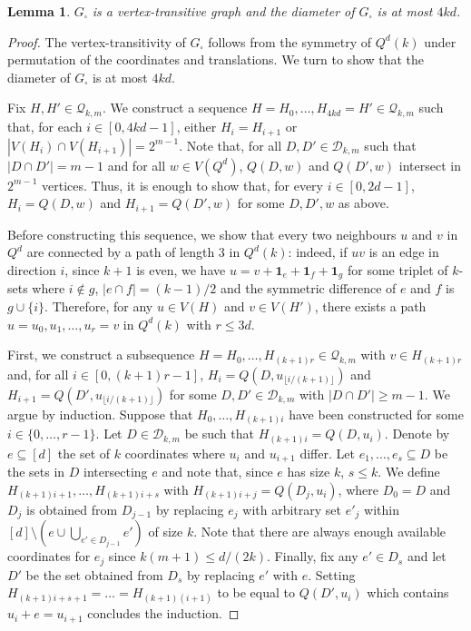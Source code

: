 \documentclass{article}
\newtheorem{lemma}[thm]{Lemma}
\theoremstyle{definition}
\newcommand{\cD}{\mathcal{D}}
\newcommand{\cQ}{\mathcal{Q}}
\begin{document}
\begin{lemma}\label{lem:diameter}
$G_{\square}$ is a vertex-transitive graph and the diameter of $G_{\square}$ is at most $4kd$. 
\end{lemma}
\begin{proof}
The vertex-transitivity of $G_\square$ follows from the symmetry of $Q^d(k)$ under permutation of the coordinates and translations. We turn to show that the diameter of $G_{\square}$ is at most $4kd$. 

Fix $H,H'\in\cQ_{k,m}$. We construct a sequence $H=H_0,\ldots,H_{4kd}=H'\in\cQ_{k,m}$ such that, for each $i\in [0,4kd-1]$, either $H_i=H_{i+1}$ or $|V(H_i)\cap V(H_{i+1})|=2^{m-1}$. 
Note that, for all $D,D'\in\cD_{k,m}$ such that $|D\cap D'|=m-1$ and for all $w\in V(Q^d)$, $Q(D,w)$ and $Q(D',w)$ intersect in $2^{m-1}$ vertices. 
Thus, it is enough to show that, for every $i\in [0,2d-1]$, $H_i=Q(D,w)$ and $H_{i+1}=Q(D',w)$ for some $D,D',w$ as above.

Before constructing this sequence, we show that every two neighbours $u$ and $v$ in $Q^d$ are connected by a path of length 3 in $Q^d(k)$: indeed, if $uv$ is an edge in direction $i$, since $k+1$ is even, we have $u=v+\mathbf{1}_{e}+\mathbf{1}_{f}+\mathbf{1}_{g}$ for some triplet of $k$-sets where $i\notin g$, $|e\cap f|=(k-1)/2$ and the symmetric difference of $e$ and $f$ is $g\cup \{i\}$.
Therefore, for any $u\in V(H)$ and $v\in V(H')$, there exists a path $u=u_0,u_1,\ldots, u_r=v$ in $Q^d(k)$ with $r\le 3d$. 

First, we construct a subsequence $H=H_0,\ldots, H_{(k+1)r}\in \cQ_{k,m}$ with $v\in H_{(k+1)r}$ and, for all $i\in [0,(k+1)r-1]$, $H_i=Q(D,u_{\lfloor i/(k+1)\rfloor})$ and $H_{i+1}=Q(D',u_{\lfloor i/(k+1)\rfloor})$ for some $D,D'\in\cD_{k,m}$ with $|D\cap D'|\ge m-1$. We argue by induction. Suppose that $H_0,\ldots,H_{(k+1)i}$ have been constructed for some $i\in \{0,\ldots,r-1\}$.
Let $D\in \cD_{k,m}$ be such that $H_{(k+1)i}=Q(D,u_i)$. Denote by $e\subseteq [d]$ the set of $k$ coordinates where $u_i$ and $u_{i+1}$ differ. Let $e_1,\ldots,e_s\subseteq D$ be the sets in $D$ intersecting $e$ and note that, since $e$ has size $k$, $s\le k$. We define $H_{(k+1)i+1},\ldots,H_{(k+1)i+s}$ with $H_{(k+1)i+j}=Q(D_j,u_i)$, where $D_0 = D$ and $D_j$ is obtained from $D_{j-1}$ by replacing $e_j$ with arbitrary set $e'_j$ within $[d]\setminus (e\cup\bigcup_{e'\in D_{j-1}} e')$ of size $k$. Note that there are always enough available coordinates for $e_j$ since $k(m+1)\le d/(2k)$. 
Finally, fix any $e'\in D_{s}$ and let $D'$ be the set obtained from $D_s$ by replacing $e'$ with $e$. 
Setting $H_{(k+1)i+s+1}=\ldots=H_{(k+1)(i+1)}$ to be equal to $Q(D',u_i)$ which contains $u_i+e=u_{i+1}$ concludes the induction. 


\end{proof}
\end{document}
